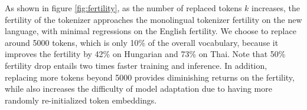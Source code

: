 As shown in figure \ref{fig:fertility}, as the number of replaced tokens $k$ increases, the fertility of the tokenizer approaches the monolingual tokenizer fertility on the new language, with minimal regressions on the English fertility. 
We choose to replace around 5000 tokens, which is only 10\% of the overall vocabulary, because it improves the fertility by 42\% on Hungarian and 73\% on Thai. Note that 50\% fertility drop entails two times faster training and inference.
In addition, replacing more tokens beyond 5000 provides diminishing returns on the fertility, while also increases the difficulty of model adaptation due to having more randomly re-initialized token embeddings.






